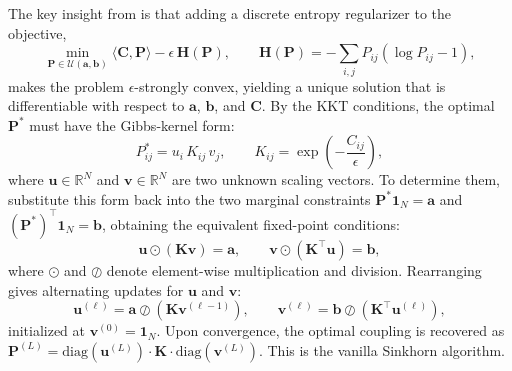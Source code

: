 \documentclass{article}
\begin{document}
The key insight from \cite{Cuturi2013SinkhornDL} is that adding a discrete entropy regularizer to the objective,
\begin{equation}
    \min_{\mathbf{P} \in \mathcal{U}(\mathbf{a}, \mathbf{b})} \langle \mathbf{C}, \mathbf{P} \rangle - \epsilon\, \mathbf{H}(\mathbf{P}), \qquad \mathbf{H}(\mathbf{P}) = -\sum_{i,j} P_{ij}(\log P_{ij} - 1),
\end{equation}
makes the problem $\epsilon$-strongly convex, yielding a unique solution that is differentiable with respect to $\mathbf{a}$, $\mathbf{b}$, and $\mathbf{C}$. By the KKT conditions, the optimal $\mathbf{P}^*$ must have the Gibbs-kernel form:
\begin{equation}
    P_{ij}^* = u_i\, K_{ij}\, v_j, \qquad K_{ij} = \exp\!\left(-\frac{C_{ij}}{\epsilon}\right),
    \label{eq:gibbs-kernel}
\end{equation}
where $\mathbf{u} \in \mathbb{R}^N$ and $\mathbf{v} \in \mathbb{R}^N$ are two unknown scaling vectors. To determine them, substitute this form back into the two marginal constraints $\mathbf{P}^*\mathbf{1}_N = \mathbf{a}$ and $(\mathbf{P}^*)^\top \mathbf{1}_N = \mathbf{b}$, obtaining the equivalent fixed-point conditions:
\begin{equation}
    \mathbf{u} \odot (\mathbf{K}\mathbf{v}) = \mathbf{a}, \qquad \mathbf{v} \odot (\mathbf{K}^\top \mathbf{u}) = \mathbf{b},
\end{equation}
where $\odot$ and $\oslash$ denote element-wise multiplication and division. Rearranging gives alternating updates for $\mathbf{u}$ and $\mathbf{v}$:
\begin{equation}
    \mathbf{u}^{(\ell)} = \mathbf{a} \oslash \!\left(\mathbf{K}\mathbf{v}^{(\ell-1)}\right), \qquad \mathbf{v}^{(\ell)} = \mathbf{b} \oslash \!\left(\mathbf{K}^\top \mathbf{u}^{(\ell)}\right),
    \label{eq:vanilla-sinkhorn}
\end{equation}
initialized at $\mathbf{v}^{(0)} = \mathbf{1}_N$. Upon convergence, the optimal coupling is recovered as $\mathbf{P}^{(L)} = \mathrm{diag}(\mathbf{u}^{(L)}) \cdot \mathbf{K} \cdot \mathrm{diag}(\mathbf{v}^{(L)})$. This is the vanilla Sinkhorn algorithm.
\end{document}
